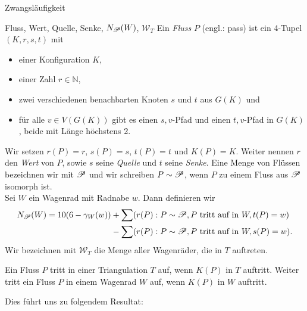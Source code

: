 \begin{section}{Zwangsläufigkeit}
 \begin{definition}{Fluss, Wert, Quelle, Senke, $N_{\mathscr{P}}(W)$, $\mathscr{W}_T$}
  Ein \textit{Fluss} $P$ (engl.: pass) ist ein 4-Tupel $(K,r,s,t)$ mit
  \begin{itemize}
   \item einer Konfiguration $K$,
   \item einer Zahl $r \in \mathbb{N}$,
   \item zwei verschiedenen benachbarten Knoten $s$ und $t$ aus $G(K)$ und
   \item für alle $v \in V(G(K))$ gibt es einen $s,v$-Pfad und einen $t,v$-Pfad in $G(K)$, beide mit Länge höchstens 2.
  \end{itemize}
  Wir setzen $r(P) = r$, $s(P) = s$, $t(P) = t$ und $K(P) = K$. Weiter nennen $r$ den \textit{Wert} von $P$, sowie $s$ seine \textit{Quelle} und $t$ seine \textit{Senke}. Eine Menge von Flüssen bezeichnen wir mit $\mathscr{P}$ und wir schreiben $P \sim \mathscr{P}$, wenn $P$ zu einem Fluss aus $\mathscr{P}$ isomorph ist. \\
  Sei $W$ ein Wagenrad mit Radnabe $w$. Dann definieren wir\\
  \begin{align*}
     N_{\mathscr{P}}(W) = 10(6-\gamma_W(w)) &+ \sum (r(P) : P \sim \mathscr{P}, P \text{ tritt auf in } W, t(P)=w)\\
				   &- \sum (r(P) : P \sim \mathscr{P}, P \text{ tritt auf in } W, s(P)=w)\text{.}
  \end{align*}
  Wir bezeichnen mit $\mathscr{W}_T$ die Menge aller Wagenräder, die in $T$ auftreten. 
 \end{definition}
  
 Ein Fluss $P$ tritt in einer Triangulation $T$ auf, wenn $K(P)$ in $T$ auftritt. Weiter tritt ein Fluss $P$ in einem Wagenrad $W$ auf, wenn $K(P)$ in $W$ auftritt.
 
 Dies führt uns zu folgendem Resultat:
 

\end{section}
